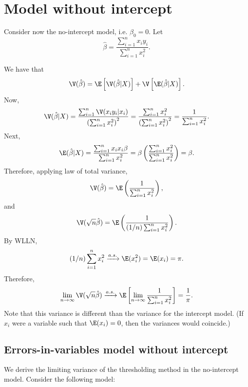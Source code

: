 \documentclass[12pt]{article}
\begin{document}
\section{Model without intercept}

Consider now the no-intercept model, i.e. $\beta_0 = 0.$ Let 
$$ \hat{\beta} = \frac{ \sum_{i=1}^n x_i y_i }{ \sum_{i=1}^n x_i^2}.$$

We have that 
$$ \V(\hat{\beta}) = \E\left[\V(\hat{\beta}|X)\right] + \V \left[ \E ({\hat{\beta}}|X) \right].$$
Now,
$$ \V( \hat{\beta} | X) = \frac{\sum_{i=1}^n \V(x_i y_i | x_i) }{ \left( \sum_{i=1}^n x_i^2 \right)^2} = \frac{ \sum_{i=1}^n x_i^2 }{ \left( \sum_{i=1}^n x_i^2\right)^2 } = \frac{1}{ \sum_{i=1}^n x_i^2 } .$$
Next,
$$\E(\hat{\beta}|X) = \frac{ \sum_{i=1}^n x_i x_i \beta  }{\sum_{i=1}^n x_i^2} = \beta \left( \frac{ \sum_{i=1}^n x_i^2 }{ \sum_{i=1}^n x_i^2} \right) = \beta.$$
Therefore, applying law of total variance,
$$ \V(\hat{\beta}) = \E \left( \frac{ 1 }{ \sum_{i=1}^n x_i^2 } \right),$$ and
$$ \V (\sqrt{n} \hat{\beta}) = \E \left(\frac{1}{(1/n) \sum_{i=1}^n x_i^2}\right).$$ By WLLN,
$$ (1/n) \sum_{i=1}^n x_i^2 \xrightarrow{a.s.} \E(x_i^2) = \E(x_i) = \pi. $$ Therefore,
$$\lim_{n \to \infty} \V(\sqrt{n} \hat{\beta}) \xrightarrow{a.s.} \E \left[ \lim_{n \to \infty} \frac{1}{ \sum_{i=1}^n x_i^2 } \right] = \frac{1}{\pi}.$$ Note that this variance is different than the variance for the intercept model. (If $x_i$ were a variable such that $\E(x_i) = 0$, then the variances would coincide.)

\subsection{Errors-in-variables model without intercept}

We derive the limiting variance of the thresholding method in the no-intercept model. Consider the following model:
\end{document}
